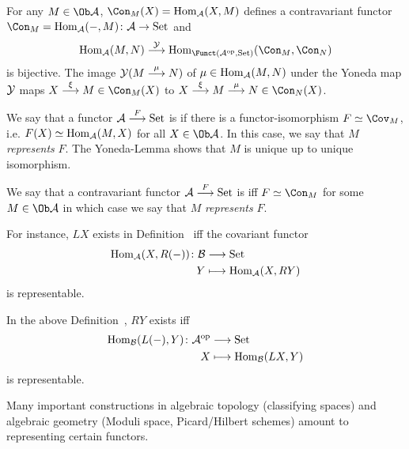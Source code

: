 \documentclass[a4paper,parskip=half,numbers=enddot, DIV=12]{scrreprt}
\begin{document}
    \begin{lem} 
    	For any $M\in\Ob \Aa$, $\Con_M(X) = \Hom_\Aa(X,M)$ defines a contravariant functor $\Con_M=\Hom_\Aa(-,M)\colon \Aa\morphism \cat{Set}$ and 
    	\begin{align*}
    	\Hom_\Aa(M,N) \morphism[\Yy] \Hom_{\Funct(\Aa^\op,\cat{Set})}(\Con_M,\Con_N)
    	\end{align*}
    	is bijective. The image $\Yy(M\morphism[\mu]N)$ of $\mu\in\operatorname{Hom}_{\mathcal{A}}(M,N)$ under the Yoneda map $\mathcal{Y}$ maps $X\morphism[\xi]M\in\Con_M(X)$ to $X\morphism[\xi]M\morphism[\mu]N\in\Con_N(X)$.
    \end{lem}
    \begin{defi}
    	\begin{alphanumerate}
    		\item We say that a functor $\Aa\morphism[F] \cat{Set}$ is  if there is a functor-isomorphism $F\simeq \Cov_M$, i.e. $F(X) \simeq \operatorname{Hom}_{\mathcal{A}}(M,X)$ for all $X\in\Ob\Aa$. In this case, we say that $M$ \emph{represents} $F$. The Yoneda-Lemma shows that $M$ is unique up to unique isomorphism.
    		\item We say that a contravariant functor $\Aa\morphism[F]\cat{Set}$ is  iff $F\simeq \Con_M$ for some $M\in\Ob\Aa$ in which case we say that $M$ \emph{represents} $F$.
    	\end{alphanumerate}
    \end{defi}
    \begin{rem*}
    	\begin{alphanumerate}
    		\item  For instance, $LX$ exists in Definition~ iff the covariant functor 
    		\begin{align*}
    			\Hom_\Aa(X,R(-))\colon\Bb&\morphism\cat{Set}\\
    			Y &\longmapsto \Hom_\Aa(X, RY)
    		\end{align*}
    		is representable.
          \item
             In the above Definition~, $RY$ exists iff 
            \begin{align*}
            	\Hom_\Bb(L(-), Y)\colon\Aa^\op&\morphism\cat{Set}\\
            	X&\longmapsto \Hom_\Bb(LX,Y)
            \end{align*}
            is representable.
          \item 
            Many important constructions in algebraic topology (classifying spaces) and algebraic geometry (Moduli space, Picard/Hilbert schemes) amount to representing certain functors.
        \end{alphanumerate}
	\end{rem*}
\end{document}
